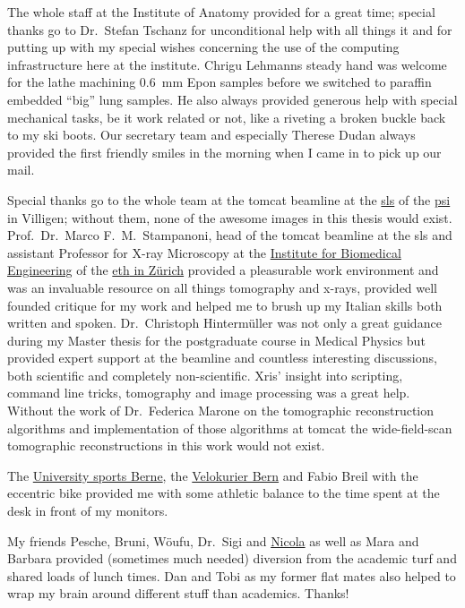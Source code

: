 The whole staff at the Institute of Anatomy provided for a great time; special thanks go to Dr.\ Stefan Tschanz for unconditional help with all things \acs{it} and for putting up with my special wishes concerning the use of the computing infrastructure here at the institute. Chrigu Lehmanns steady hand was welcome for the lathe machining \SI{0.6}{\milli\meter} Epon samples before we switched to paraffin embedded ``big'' lung samples. He also always provided generous help with special mechanical tasks, be it work related or not, \eg like a riveting a broken buckle back to my ski boots. Our secretary team and especially Therese Dudan always provided the first friendly smiles in the morning when I came in to pick up our mail.

Special thanks go to the whole team at the \acs{tomcat} beamline at the \href{http://sls.web.psi.ch/}{\acl{sls}} of the \href{http://psi.ch/}{\acl{psi}} in Villigen; without them, none of the awesome images in this thesis would exist. Prof.\ Dr.\ Marco F.\ M.\ Stampanoni, head of the \acs{tomcat} beamline at the \acl{sls} and assistant Professor for X-ray Microscopy at the \href{http://www.biomed.ee.ethz.ch/}{Institute for Biomedical Engineering} of the \href{http://ethz.ch/}{\acs{eth} in Zürich} provided a pleasurable work environment and was an invaluable resource on all things tomography and x-rays, provided well founded critique for my work and helped me to brush up my Italian skills both written and spoken. Dr.\ Christoph Hintermüller was not only a great guidance during my Master thesis for the postgraduate course in Medical Physics but provided expert support at the beamline and countless interesting discussions, both scientific and completely non-scientific. Xris' insight into scripting, command line tricks, tomography and image processing was a great help. Without the work of Dr.\ Federica Marone on the tomographic reconstruction algorithms and implementation of those algorithms at \acs{tomcat} the wide-field-scan tomographic reconstructions in this work would not exist.

The \href{http://www.sport.unibe.ch/}{University sports Berne}, the \href{http://velokurierbern.ch/}{Velokurier Bern} and Fabio Breil with the eccentric bike provided me with some athletic balance to the time spent at the desk in front of my monitors.

My friends Pesche, Bruni, Wöufu, Dr.\ Sigi and \href{http://www.nicolafrombern.com/}{Nicola} as well as Mara and Barbara provided (sometimes much needed) diversion from the academic turf and shared loads of lunch times. Dan and Tobi as my former flat mates also helped to wrap my brain around different stuff than academics. Thanks!

